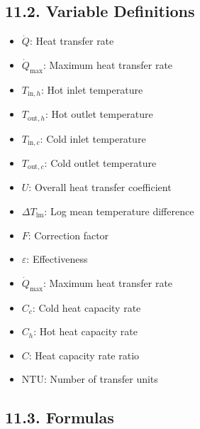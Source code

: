 \begin{multicols*}{2}
\subsection*{11.2. Variable Definitions}
\begin{itemize}
    \item $\dot{Q}$: Heat transfer rate
    \item $\dot{Q}_{\text{max}}$: Maximum heat transfer rate
    \item $T_{\text{in},h}$: Hot inlet temperature
    \item $T_{\text{out},h}$: Hot outlet temperature
    \item $T_{\text{in},c}$: Cold inlet temperature
    \item $T_{\text{out},c}$: Cold outlet temperature
    \item $U$: Overall heat transfer coefficient
    \item $\Delta T_{\text{lm}}$: Log mean temperature difference
    \item $F$: Correction factor 
    \item $\varepsilon$: Effectiveness
    \item $\dot{Q}_{\text{max}}$: Maximum heat transfer rate
    \item $C_c$: Cold heat capacity rate
    \item $C_h$: Hot heat capacity rate
    \item $C$: Heat capacity rate ratio
    \item $\text{NTU}$: Number of transfer units
\end{itemize}

\subsection*{11.3. Formulas}

\end{multicols*}
